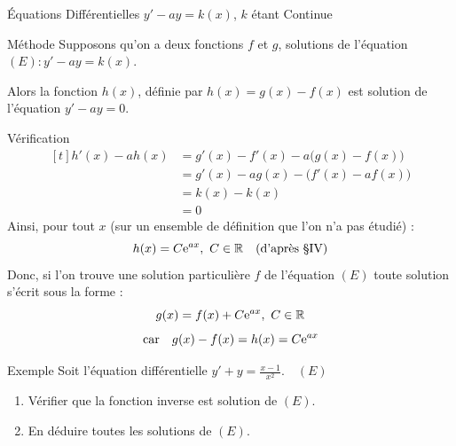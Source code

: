 \documentclass{coursbook}
\begin{document}
    \begin{Gpartie}{Équations Différentielles $y'-ay=k(x)$, $k$ étant Continue} 
        \begin{Spartie}{Méthode} 
            Supposons qu'on a deux fonctions $f$ et $g$, solutions de l'équation $(E): y'-ay=k(x)$.

            Alors la fonction $h(x)$, définie par $h(x)=g(x)-f(x)$ est solution de l'équation $y'-ay=0$.
            \begin{SSpartie}{Vérification} 
                \[\begin{aligned}[t]
                    h'(x)-ah(x)&=g'(x)-f'(x)-a\big(g(x)-f(x)\big) \\
                    &=g'(x)-ag(x)-\big(f'(x)-a f(x)\big) \\
                    &=k(x)-k(x) \\
                    &=0
                \end{aligned}\]
                Ainsi, pour tout $x$ (sur un ensemble de définition que l'on n’a pas étudié) :
                \[h(x)=C\me^{ax},~C\in\mathbb{R}\quad\text{(d'après \textsection IV)}\]
                Donc, si l'on trouve une solution particulière $f$ de l'équation $(E)$ toute solution s'écrit sous la forme :
                \[g(x)=f(x)+C\mathrm{e}^{ax},~C\in\mathbb{R}\]
                \[\text{car}\quad g(x)-f(x)=h(x)=C\mathrm{e}^{ax}\] 
            \end{SSpartie}
        \end{Spartie}
        \begin{Spartie}{Exemple} 
            Soit l'équation différentielle $y'+y=\frac{x-1}{x^2}$.$\quad(E)$
            \begin{enumerate}
                \item Vérifier que la fonction inverse est solution de $(E)$.
                \item En déduire toutes les solutions de $(E)$.
            \end{enumerate}


\end{Spartie}
\end{Gpartie}
\end{document}
